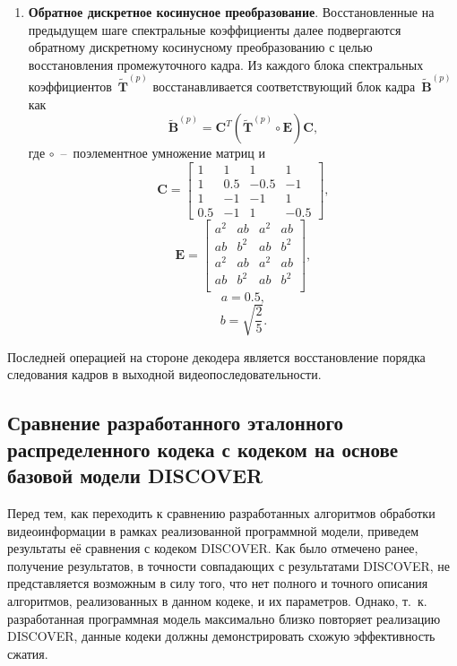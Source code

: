 \begin{enumerate}
  \item \textbf{Обратное дискретное косинусное преобразование}.
  Восстановленные на предыдущем шаге спектральные коэффициенты далее подвергаются обратному дискретному косинусному преобразованию с целью восстановления промежуточного кадра. Из каждого блока спектральных коэффициентов~$\widetilde{\mathbf{T}}^{(p)}$ восстанавливается соответствующий блок кадра~$\widetilde{\mathbf{B}}^{(p)}$ как
  \begin{equation*}
  \widetilde{\mathbf{B}}^{(p)} = \mathbf{C}^T (\widetilde{\mathbf{T}}^{(p)} \circ \mathbf{E}) \mathbf{C},
  \end{equation*}
  где $\circ$~--~поэлементное умножение матриц и
  \begin{equation*}
  \mathbf{C} = \begin{bmatrix}
  1 & 1 & 1 & 1 \\
  1 & 0.5 & -0.5 & -1 \\
  1 & -1 & -1 & 1 \\
  0.5 & -1 & 1 & -0.5
  \end{bmatrix},
  \end{equation*}
  \begin{equation*}
  \mathbf{E} = \begin{bmatrix}
  a^2 & ab & a^2 & ab \\
  ab & b^2 & ab & b^2 \\
  a^2 & ab & a^2 & ab \\
  ab & b^2 & ab & b^2 \\
  \end{bmatrix},
  \end{equation*}
  \begin{equation*}
  a = 0.5,
  \end{equation*}
  \begin{equation*}
  b = \sqrt{\frac{2}{5}}.
  \end{equation*}
\end{enumerate}

Последней операцией на стороне декодера является восстановление порядка следования кадров в выходной видеопоследовательности.

\subsection{Сравнение разработанного эталонного распределенного кодека с кодеком на основе базовой модели DISCOVER}
\label{chap:ExpResults:CodecModel:ComparisonWithDiscover}

Перед тем, как переходить к сравнению разработанных алгоритмов обработки видеоинформации в рамках реализованной программной модели, приведем результаты её сравнения с кодеком DISCOVER. Как было отмечено ранее, получение результатов, в точности совпадающих с результатами DISCOVER, не представляется возможным в силу того, что нет полного и точного описания алгоритмов, реализованных в данном кодеке, и их параметров. Однако, т.~к. разработанная программная модель максимально близко повторяет реализацию DISCOVER, данные кодеки должны демонстрировать схожую эффективность сжатия.

